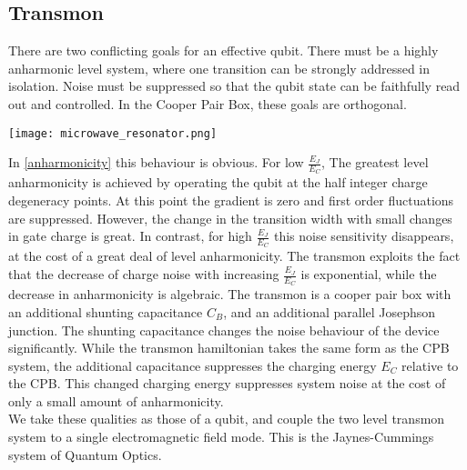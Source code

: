 \subsection{Transmon}
There are two conflicting goals for an effective qubit. 
There must be a highly anharmonic level system, where one transition can be strongly addressed in isolation. 
Noise must be suppressed so that the qubit state can be faithfully read out and controlled. 
In the Cooper Pair Box, these goals are orthogonal.
\begin{figure*}[!htb]
  \begin{minipage}{0.5\linewidth}
    \resizebox{1.0\linewidth}{!}{}
  \end{minipage}%
  \begin{minipage}{0.5\linewidth}
    \texttt{[image: microwave\_resonator.png]}
  \end{minipage}
  \caption{(a) Schematic of a transmon. New island is coupled via capacitance C and another Josephson junction. (b) Transmon design schematic. Visible is charge qubit cosine potential. Effect of shunting capacitance is absorbed in modified capacitances $C'_B,\ C_{g_2},\ C_{g_1},\ C_{in}$}
  \label{anharmonicity}
\end{figure*}
In \ref{anharmonicity} this behaviour is obvious. 
For low $\frac{E_J}{E_C}$, The greatest level anharmonicity is achieved by operating the qubit at the half integer charge degeneracy points.
At this point the gradient is zero and first order fluctuations are suppressed. 
However, the change in the transition width with small changes in gate charge is great. 
In contrast, for high $\frac{E_J}{E_C}$ this noise sensitivity disappears, at the cost of a great deal of level anharmonicity.
The transmon exploits the fact that the decrease of charge noise with increasing $\frac{E_J}{E_C}$ is exponential, while the decrease in anharmonicity is algebraic.
The transmon is a cooper pair box with an additional shunting capacitance $C_B$, and an additional parallel Josephson junction.
The shunting capacitance changes the noise behaviour of the device significantly.
While the transmon hamiltonian takes the same form as the CPB system, the additional capacitance suppresses the charging energy $E_C$ relative to the CPB.
This changed charging energy suppresses system noise at the cost of only a small amount of anharmonicity. \\

We take these qualities as those of a qubit, and couple the two level transmon system to a single electromagnetic field mode.
This is the Jaynes-Cummings system of Quantum Optics.
